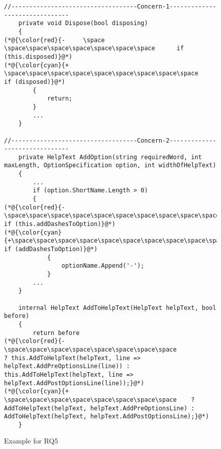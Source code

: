 \begin{figure}[t]
	\centering
	\begin{lstlisting}[]
//-----------------------------------Concern-1-------------------------------
    private void Dispose(bool disposing)
    {
(*@{\color{red}{-     \space \space\space\space\space\space\space\space      if (this.disposed)}@*)
(*@{\color{cyan}{+    \space\space\space\space\space\space\space\space\space        if (disposed)}@*)
        {
            return;
        }
        ...
    }

//-----------------------------------Concern-2-------------------------------
    private HelpText AddOption(string requiredWord, int maxLength, OptionSpecification option, int widthOfHelpText)
    {
        ...
        if (option.ShortName.Length > 0)
        {
(*@{\color{red}{-\space\space\space\space\space\space\space\space\space\space        if (this.addDashesToOption)}@*)
(*@{\color{cyan}{+\space\space\space\space\space\space\space\space\space\space       if (addDashesToOption)}@*)
	    	{
			    optionName.Append('-');
	    	}
    	...
    }
    
    internal HelpText AddToHelpText(HelpText helpText, bool before)
    {
        return before
(*@{\color{red}{- \space\space\space\space\space\space\space\space               ? this.AddToHelpText(helpText, line => helpText.AddPreOptionsLine(line)) : this.AddToHelpText(helpText, line => helpText.AddPostOptionsLine(line));}@*)
(*@{\color{cyan}{+  \space\space\space\space\space\space\space\space 	? AddToHelpText(helpText, helpText.AddPreOptionsLine) : AddToHelpText(helpText, helpText.AddPostOptionsLine);}@*)
    }

	\end{lstlisting}
	\vspace{-15pt}
	\caption{Example for RQ5}
	\vspace{-6pt}
	\label{RQ5-example}
\end{figure}
			
